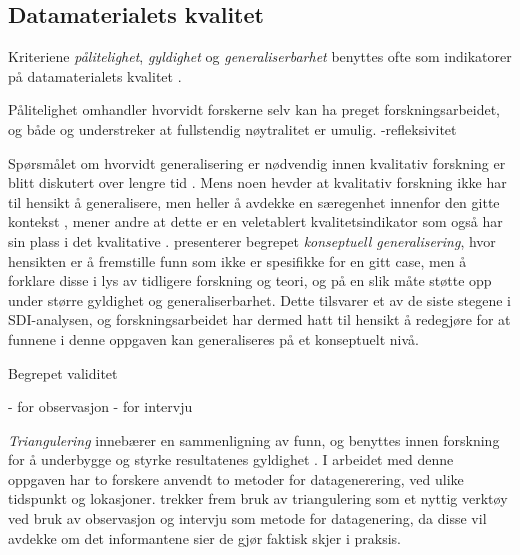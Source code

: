 \subsection{Datamaterialets kvalitet}
Kriteriene \textit{pålitelighet}, \textit{gyldighet} og \textit{generaliserbarhet} benyttes ofte som indikatorer på datamaterialets kvalitet \citep{Tjora}.


Pålitelighet omhandler hvorvidt forskerne selv kan ha preget forskningsarbeidet, og både \citet{Oates} og \citet{Tjora} understreker at fullstendig nøytralitet er umulig. 
-refleksivitet

Spørsmålet om hvorvidt generalisering er nødvendig innen kvalitativ forskning er blitt diskutert over lengre tid \citep{Tjora}. Mens noen hevder at kvalitativ forskning ikke har til hensikt å generalisere, men heller å avdekke en særegenhet innenfor den gitte kontekst \citep{Creswell, Oates}, mener andre at dette er en veletablert kvalitetsindikator som også har sin plass i det kvalitative \citep{Tjora}. \citet{Tjora} presenterer begrepet \textit{konseptuell generalisering}, hvor hensikten er å fremstille funn som ikke er spesifikke for en gitt case, men å forklare disse i lys av tidligere forskning og teori, og på en slik måte støtte opp under større gyldighet og generaliserbarhet. Dette tilsvarer et av de siste stegene i SDI-analysen, og forskningsarbeidet har dermed hatt til hensikt å redegjøre for at funnene i denne oppgaven kan generaliseres på et konseptuelt nivå. 





Begrepet validitet

- for observasjon
- for intervju

\textit{Triangulering} innebærer en sammenligning av funn, og benyttes innen forskning for å underbygge og styrke resultatenes gyldighet \citep{Silvermann, Oates}. I arbeidet med denne oppgaven har to forskere anvendt to metoder for datagenerering, ved ulike tidspunkt og lokasjoner. \citet{Oates} trekker frem bruk av triangulering som et nyttig verktøy ved bruk av observasjon og intervju som metode for datagenering, da disse vil avdekke om det informantene sier de gjør faktisk skjer i praksis.
		
